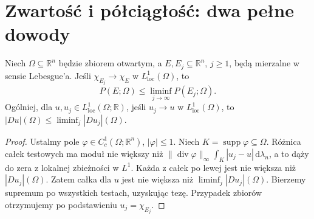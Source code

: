 \section{Zwartość i półciągłość: dwa pełne dowody}
\begin{twierdzenie}
\label{thm:perimeter-lsc-29}
Niech $\Omega\subseteq\mathbb R^n$ będzie zbiorem otwartym,
a $E,E_j\subseteq\mathbb R^n$, $j\ge1$, będą
mierzalne w sensie Lebesgue'a.
Jeśli $\chi_{E_j}\to\chi_E$ w
$L^1_{\mathrm{loc}}(\Omega)$, to
\[
 P(E;\Omega)\le\liminf_{j\to\infty}P(E_j;\Omega).
\]
Ogólniej, dla $u,u_j\in L^1_{\mathrm{loc}}(\Omega;\mathbb R)$,
jeśli $u_j\to u$ w $L^1_{\mathrm{loc}}(\Omega)$, to
$|Du|(\Omega)\le\liminf_j|Du_j|(\Omega)$.
\end{twierdzenie}
\begin{proof}
Ustalmy pole $\varphi\in C_c^1(\Omega;\mathbb R^n)$,
$|\varphi|\le1$. Niech $K=\operatorname{supp}\varphi\subseteq\Omega$.
Różnica całek testowych ma moduł nie większy
niż $\|\operatorname{div}\varphi\|_\infty
\int_K|u_j-u|\,\mathrm d\lambda_n$, a to dąży do zera
z lokalnej zbieżności w $L^1$.
Każda z całek po lewej jest nie większa niż
$|Du_j|(\Omega)$. Zatem całka dla $u$
jest nie większa niż $\liminf_j|Du_j|(\Omega)$.
Bierzemy supremum po wszystkich testach,
uzyskując tezę. Przypadek zbiorów otrzymujemy
po podstawieniu $u_j=\chi_{E_j}$.
\end{proof}

